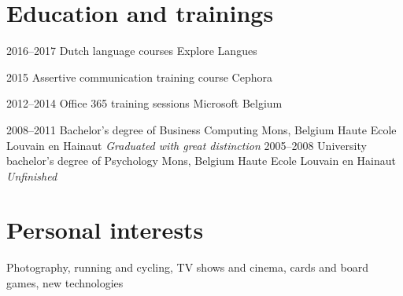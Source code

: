 \documentclass[a4paper]{cv-friggeri-x}
\begin{document}
\section{Education and trainings}
\begin{entrylist}
%
\trainingentry
{2016--2017}
{Dutch language courses}
{Explore Langues}
\end{entrylist}
%
\begin{entrylist}
\trainingentry
{2015}
{Assertive communication training course}
{Cephora}
\end{entrylist}
%
\begin{entrylist}
\trainingentry
{2012--2014}
{Office 365 training sessions}
{Microsoft Belgium}
\end{entrylist}
\begin{entrylist}
\educationentry
{2008--2011}
{Bachelor’s degree {\normalfont of Business Computing}}
{Mons, Belgium}
{Haute Ecole Louvain en Hainaut}
{\emph{Graduated with great distinction}}
%
%
\educationentry
{2005--2008}
{University bachelor's degree {\normalfont of Psychology}}
{Mons, Belgium}
{Haute Ecole Louvain en Hainaut}
{\emph{Unfinished}}
%
%
\end{entrylist}
%
%
\section{Personal interests}
%
Photography, running and cycling, TV shows and cinema, cards and board games, new technologies
\end{document}
